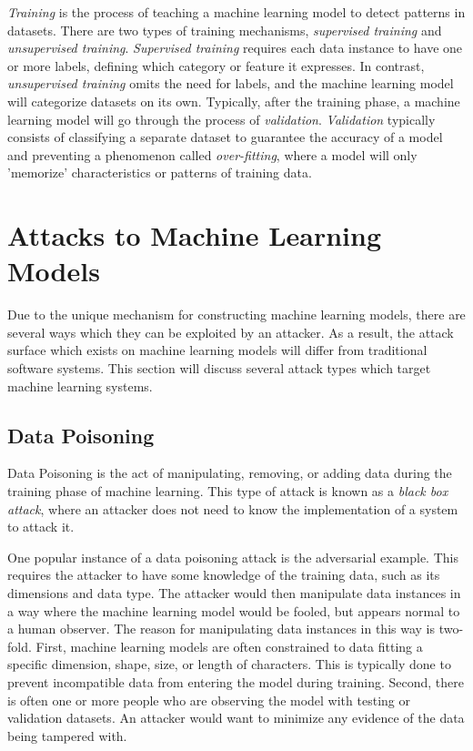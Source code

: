 \documentclass[11pt,conference]{IEEEtran}
\begin{document}
\emph{Training} is the process of teaching a machine learning model to detect patterns
in datasets. There are two types of training mechanisms, \emph{supervised
training} and \emph{unsupervised training}. \emph{Supervised training} requires
each data instance to have one or more labels, defining which category or
feature it expresses. In contrast, \emph{unsupervised training} omits the need
for labels, and the machine learning model will categorize datasets on its own.
Typically, after the training phase, a machine learning model will go through
the process of \emph{validation}. \emph{Validation} typically consists of
classifying a separate dataset to guarantee the accuracy of a model and
preventing a phenomenon called \emph{over-fitting}, where a model will only
'memorize' characteristics or patterns of training data.

\section{Attacks to Machine Learning Models}
Due to the unique mechanism for constructing machine learning models, there are
several ways which they can be exploited by an attacker. As a result, the
attack surface which exists on machine learning models will differ from
traditional software systems.
This section will discuss several attack types which target machine learning
systems.

\subsection{Data Poisoning}
Data Poisoning is the act of manipulating, removing, or adding
data during the training phase of machine learning. This type of attack is
known as a \emph{black box attack}, where an attacker does not need to know the
implementation of a system to attack it.

One popular instance of a data poisoning attack is the adversarial
example. This requires the attacker to have some knowledge of the
training data, such as its dimensions and data type. The attacker would then
manipulate data instances in a way where the machine learning model would
be fooled, but appears normal to a human observer. The reason for manipulating
data instances in this way is two-fold. First, machine learning models are
often constrained to data fitting a specific dimension, shape, size, or length
of characters. This is typically done to prevent incompatible data from
entering the model during training. Second, there is often one or more people
who are observing the model with testing or validation datasets. An attacker
would want to minimize any evidence of the data being tampered with.
\end{document}
